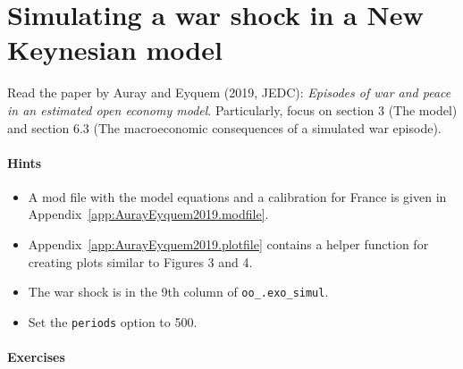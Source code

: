 \documentclass[a4paper]{scrartcl}
\begin{document}
\newpage

\section{Simulating a war shock in a New Keynesian model}
Read the paper by Auray and Eyquem (2019, JEDC): \emph{Episodes of war and peace in an estimated open economy model}.
Particularly, focus on section 3 (The model) and section 6.3 (The macroeconomic consequences of a simulated war episode).

\paragraph{Hints}

\begin{itemize}
\item
A mod file with the model equations and a calibration for France is given in Appendix~\ref{app:AurayEyquem2019.modfile}.

\item
Appendix~\ref{app:AurayEyquem2019.plotfile} contains a helper function for creating plots similar to Figures 3 and 4.

\item
The war shock is in the 9th column of \texttt{oo\_.exo\_simul}.

\item
Set the \texttt{periods} option to 500.
\end{itemize}

\paragraph{Exercises}
\end{document}
